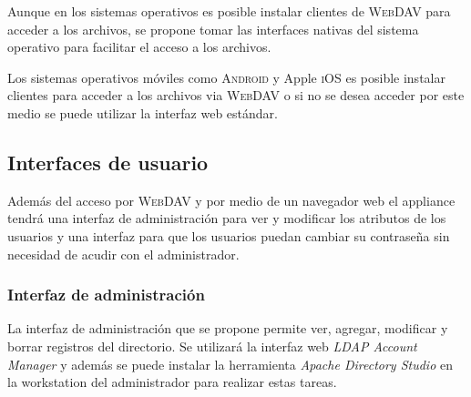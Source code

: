 Aunque en los sistemas operativos es posible instalar clientes de \textsc{WebDAV} para acceder a los archivos, se propone tomar las interfaces nativas del sistema operativo para facilitar el acceso a los archivos.

Los sistemas operativos m\'{o}viles como \textsc{Android} y Apple \textsc{iOS} es posible instalar clientes para acceder a los archivos via \textsc{WebDAV} o si no se desea acceder por este medio se puede utilizar la interfaz web est\'{a}ndar.

%
%
%

      \subsection {Interfaces de usuario}

Adem\'{a}s del acceso por \textsc{WebDAV} y por medio de un navegador web el appliance tendr\'{a} una interfaz de administraci\'{o}n para ver y modificar los atributos de los usuarios y una interfaz para que los usuarios puedan cambiar su contrase\~{n}a sin necesidad de acudir con el administrador.

        \subsubsection {Interfaz de administraci\'{o}n}

La interfaz de administraci\'{o}n que se propone permite ver, agregar, modificar y borrar registros del directorio. Se utilizar\'{a} la interfaz web \textit{LDAP Account Manager} y adem\'{a}s se puede instalar la herramienta \textit{Apache Directory Studio} en la workstation del administrador para realizar  estas tareas.

